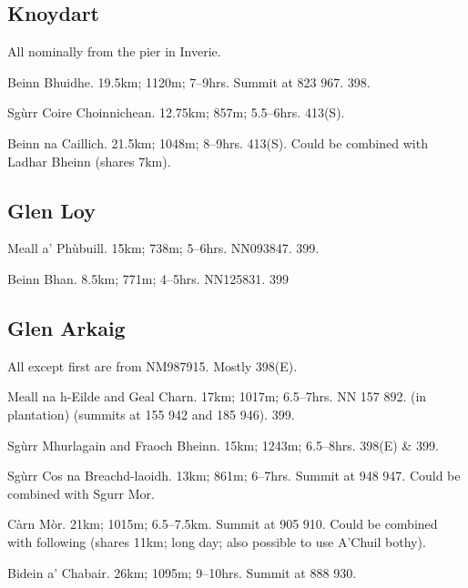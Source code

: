 
\subsection{Knoydart}

All nominally from the pier in Inverie. 

\begin{munros}
\item Beinn Bhuidhe.  19.5km; 1120m; 7--9hrs.  Summit at 823 967.  398.

\item Sgùrr Coire Choinnichean.  12.75km; 857m; 5.5--6hrs.  413(S).

\item Beinn na Caillich.  21.5km; 1048m; 8--9hrs.  413(S).  Could be combined
  with Ladhar Bheinn (shares 7km).  
\end{munros}


\subsection{Glen Loy}

\begin{munros}
\item
Meall a' Phùbuill.  15km; 738m; 5--6hrs.  NN093847.  399.

\item  Beinn Bhan.  8.5km; 771m; 4--5hrs.  NN125831.  399
\end{munros}


\subsection{Glen Arkaig}

All except first are from NM987915.  Mostly 398(E).

\begin{munros}
\item
Meall na h-Eilde and Geal Charn.  17km; 1017m; 6.5--7hrs.  NN 157 892. (in
plantation) (summits at 155 942 and 185 946).  399.

\item Sgùrr Mhurlagain and Fraoch Bheinn.  15km; 1243m; 6.5--8hrs.  
  398(E) \& 399. 

\item
Sgùrr Cos na Breachd-laoidh.  13km; 861m; 6--7hrs.   Summit at 948 947.
Could be combined with Sgurr Mor.  

\item Càrn Mòr.  21km; 1015m; 6.5--7.5km.  Summit at 905 910.  Could be
  combined with following (shares 11km; long day; also possible to use A'Chuil
  bothy).

\item Bidein a' Chabair.  26km; 1095m; 9--10hrs.  Summit at 888 930.  
\end{munros}

